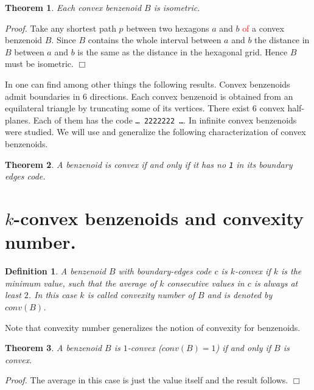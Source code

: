 \documentclass[a4paper,10pt]{article}
\newcounter{theorem}
\newtheorem{definition}{Definition}[section]
\newtheorem{theorem}{Theorem}[section]
\newenvironment{proof}{\medskip\emph{Proof.}}{\hfill$\Box$\medskip}
\newcommand\TODO[1]{\textcolor{red}{#1}}
\begin{document}
{\begin{theorem}
Each convex benzenoid $B$ is isometric.
\end{theorem}
\begin{proof}
Take any shortest path $p$ between two hexagons $a$ and $b$ \TODO{of} a convex benzenoid $B$. Since $B$ contains the whole interval between $a$ and $b$ the distance in $B$
between $a$ and $b$ is the same as the distance in the hexagonal grid. Hence $B$ must be isometric.
\end{proof}

In \cite{basic2017} one can find among other things the following results. Convex benzenoids admit boundaries in 6 directions.  Each convex benzenoid is obtained from an equilateral triangle by truncating some of its vertices. There exist 6 convex half-planes. Each of them has the code {\tt \ldots\,2222222\,\ldots}. In \cite{basic2017a} infinite convex benzenoids were studied. We will use and generalize the following characterization of convex benzenoids.

\begin{theorem}
A benzenoid is \emph{convex} if and only if it has no{ \tt 1} in its boundary edges code.
\end{theorem}

\section{$k$-convex benzenoids and convexity number.}
\begin{definition}
A benzenoid $B$ with boundary-edges code $c$ is $k$-convex if $k$ is the minimum value, such that the average of $k$ consecutive values in $c$ is always at least $2$. In this case $k$ is called \emph{convexity number} of $B$ and is denoted by $conv(B)$.
\end{definition}

Note that convexity number generalizes the notion of convexity for benzenoids.

\begin{theorem}
A benzenoid $B$ is $1$-convex ($conv(B) = 1$) if and only if $B$ is convex.
\end{theorem}

\begin{proof}
The average in this case is just the value itself and the result follows.
\end{proof}




}
\end{document}
